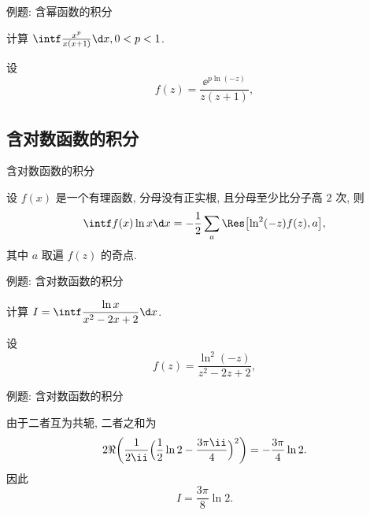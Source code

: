 \begin{frame}{例题: 含幂函数的积分}
	\onslide<+->
	\begin{example}[near]
		计算 $\intf\frac{x^p}{x(x+1)}\d x,0<p<1$.
	\end{example}
	\onslide<+->
	\begin{solution}[near]
		设
		\[
			f(z)=\frac{\ee^{p\ln(-z)}}{z(z+1)},
		\]
		\bigdel
	\end{solution}
\end{frame}

\subsection{含对数函数的积分}

\begin{frame}{含对数函数的积分}
	\onslide<+->
	\begin{theorem}
		设 $f(x)$ 是一个有理函数, 分母没有正实根, 且分母至少比分子高 $2$ 次, 则
		\[
			\intf f(x)\ln x\d x
			=-\frac12 \sum_a \Res\bigl[\ln^2(-z)f(z),a\bigr],
		\]
		其中 $a$ 取遍 $f(z)$ 的奇点.
	\end{theorem}
\end{frame}


\begin{frame}{例题: 含对数函数的积分}
	\onslide<+->
	\begin{example}[nearnext]
		计算 $I=\intf\dfrac{\ln x}{x^2-2x+2}\d x$.
	\end{example}
	\onslide<+->
	\begin{solution}[nearprev]
		设
		\[
			f(z)=\frac{\ln^2(-z)}{z^2-2z+2},
		\]
		\bigdel
	\end{solution}
\end{frame}
	
	
\begin{frame}{例题: 含对数函数的积分}
	\onslide<+->
	\begin{solution}[][]
		由于二者互为共轭, 二者之和为 
		\[
			2\Re\biggl(\frac1{2\ii}\Bigl(\frac12\ln2-\frac{3\pi\ii}4\Bigr)^2\biggr)
			=-\frac{3\pi}4\ln2.
		\]
		因此 
		\[
			I=\frac{3\pi}8\ln2.
		\]
	\end{solution}
\end{frame}


